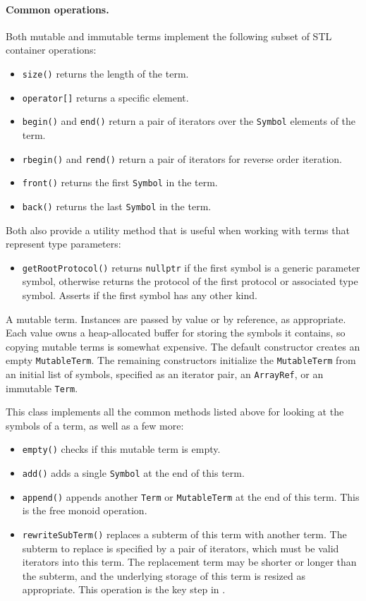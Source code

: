 \documentclass[../generics]{subfiles}
\begin{document}
\paragraph{Common operations.} Both mutable and immutable terms implement the following subset of STL container operations:
\begin{itemize}
\item \texttt{size()} returns the length of the term.
\item \texttt{operator[]} returns a specific element.
\item \texttt{begin()} and \texttt{end()} return a pair of iterators over the \texttt{Symbol} elements of the term.
\item \texttt{rbegin()} and \texttt{rend()} return a pair of iterators for reverse order iteration.
\item \texttt{front()} returns the first \texttt{Symbol} in the term.
\item \texttt{back()} returns the last \texttt{Symbol} in the term.
\end{itemize}
Both also provide a utility method that is useful when working with terms that represent type parameters:
\begin{itemize}
\item \texttt{getRootProtocol()} returns \texttt{nullptr} if the first symbol is a generic parameter symbol, otherwise returns the protocol of the first protocol or associated type symbol. Asserts if the first symbol has any other kind.
\end{itemize}

A mutable term. Instances are passed by value or by reference, as appropriate. Each value owns a heap-allocated buffer for storing the symbols it contains, so copying mutable terms is somewhat expensive. The default constructor creates an empty \texttt{MutableTerm}. The remaining constructors initialize the \texttt{MutableTerm} from an initial list of symbols, specified as an iterator pair, an \texttt{ArrayRef}, or an immutable \texttt{Term}.

This class implements all the common methods listed above for looking at the symbols of a term, as well as a few more:
\begin{itemize}
\item \texttt{empty()} checks if this mutable term is empty.
\item \texttt{add()} adds a single \texttt{Symbol} at the end of this term.
\item \texttt{append()} appends another \texttt{Term} or \texttt{MutableTerm} at the end of this term. This is the free monoid operation.
\item \texttt{rewriteSubTerm()} replaces a subterm of this term with another term. The subterm to replace is specified by a pair of iterators, which must be valid iterators into this term. The replacement term may be shorter or longer than the subterm, and the underlying storage of this term is resized as appropriate. This operation is the key step in .
\end{itemize}
\end{document}
